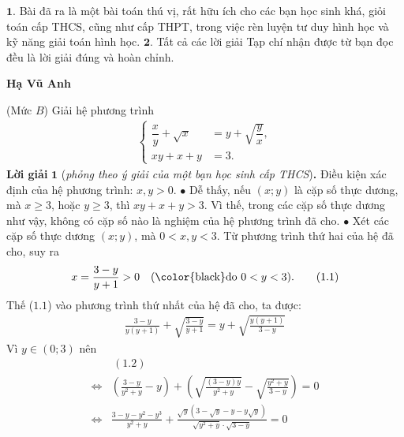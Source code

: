 \begin{multicols}{2}
	$\pmb{1.}$ Bài đã ra là một bài toán thú vị, rất hữu ích cho các bạn học sinh khá, giỏi toán cấp THCS, cũng như cấp THPT, trong việc rèn luyện tư duy hình học và kỹ năng giải toán hình học.
	\vskip 0.05cm
	$\pmb{2.}$ Tất cả các lời giải Tạp chí nhận được từ bạn đọc đều là lời giải đúng và hoàn chỉnh.
	\begin{flushright}
		\textbf{\color{thachthuctoanhoc}Hạ Vũ Anh}
	\end{flushright}
	{}
	(Mức $B$) Giải hệ phương trình 
	\begin{align*}
		\begin{cases}
			\dfrac{x}{y}+\sqrt{x}&=y+\sqrt{\dfrac{y}{x}},
			\\x y+x+y&=3.
		\end{cases}
	\end{align*}
	\textbf{\color{thachthuctoanhoc}Lời giải} $\pmb{1}$ (\textit{phỏng theo ý giải của một bạn học sinh cấp THCS})\textbf{\color{thachthuctoanhoc}.}
	\vskip 0.05cm
	Điều kiện xác định của hệ phương trình: $x, y > 0$.
	\vskip 0.05cm
	$\bullet$ Dễ thấy, nếu $(x; y)$ là cặp số thực dương, mà $x \ge 3$, hoặc $y \ge 3$, thì $xy + x + y > 3$. Vì thế, trong các cặp số thực dương như vậy, không có cặp số nào là nghiệm của hệ phương trình đã cho.
	\vskip 0.05cm
	$\bullet$ Xét các cặp số thực dương $(x; y)$, mà \linebreak$0 < x, y < 3$.
	\vskip 0.05cm
	Từ phương trình thứ hai của hệ đã cho, suy ra
	\begin{align*}
		x = \frac{{3 - y}}{{y + 1}} > 0  \quad(\text{\color{black}do } 0 < y < 3).      \tag{$1.1$}
	\end{align*}
	Thế ($1.1$) vào phương trình thứ nhất của hệ đã cho, ta được:
	\begin{align*}
		\frac{{3 \!-\! y}}{{y\left( {y \!+\! 1} \right)}} \!+\! \sqrt {\frac{{3 \!-\! y}}{{y \!+\! 1}}}  \!=\! y \!+\! \sqrt {\frac{{y\left( {y \!+\! 1} \right)}}{{3 \!-\! y}}} \tag{$1.2$}
	\end{align*}
	Vì $y \in (0; 3)$ nên
	\begin{align*}
		&\,(1.2) \\
		\Leftrightarrow &\left(\!{\frac{{3 \!-\! y}}{{{y^2} \!+\! y}} \!-\! y}\! \right) \!+\!\! \left(\!\!\!\! {\sqrt {\frac{{\left( {3 \!-\! y} \right)y}}{{{y^2} \!+\! y}}}  \!-\! \sqrt {\frac{{{y^2} \!+\! y}}{{3 \!-\! y}}} } \right) \!\!=\! 0\\
		\Leftrightarrow &\frac{{3 \!-\! y \!-\! {y^2} \!-\! {y^3}}}{{{y^2} \!+\! y}} \!+\! \frac{{\sqrt y \left( {3 \!-\! \sqrt y  \!-\! y \!-\! y\sqrt y } \right)}}{{\sqrt {{y^2} \!+\! y}  \!\cdot\! \sqrt {3 \!-\! y} }} \!=\! 0\\

\end{align*}
\end{multicols}
